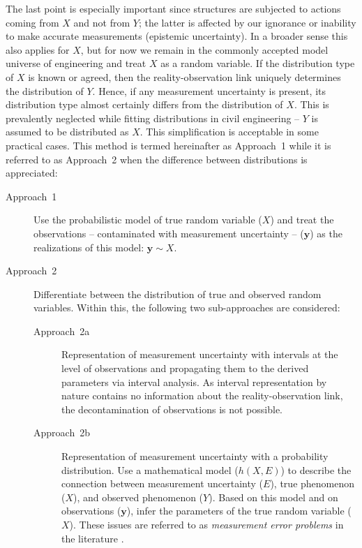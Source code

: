 The last point is especially important since structures are subjected to actions coming from $X$ and not from $Y$; the latter is affected by our ignorance or inability to make accurate measurements (epistemic uncertainty). In a broader sense this also applies for $X$, but for now we remain in the commonly accepted model universe of engineering and treat $X$ as a random variable. If the distribution type of $X$ is known or agreed, then the reality-observation link uniquely determines the distribution of $Y$. Hence, if any measurement uncertainty is present, its distribution type almost certainly differs from the distribution of $X$. This is prevalently neglected while fitting distributions in civil engineering -- $Y$ is assumed to be distributed as $X$. This simplification is acceptable in some practical cases. This method is termed hereinafter as Approach~1 while it is referred to as Approach~2 when the difference between distributions is appreciated:
\begin{description}
	\item[Approach~1] Use the probabilistic model of true random variable ($X$) and treat the observations -- contaminated with measurement uncertainty -- ($\mathbf{y}$) as the realizations of this model: $\mathbf{y} \sim X$.
	\item[Approach~2] Differentiate between the distribution of true and observed random variables. Within this, the following two sub-approaches are considered:
	\begin{description}
		\item[Approach~2a] Representation of measurement uncertainty with intervals at the level of observations and propagating them to the derived parameters via interval analysis. As interval representation by nature contains no information about the reality-observation link, the decontamination of observations is not possible.
		\item[Approach~2b] Representation of measurement uncertainty with a probability distribution. Use a mathematical model ($h(X, E)$) to describe the connection between measurement uncertainty ($E$), true phenomenon ($X$), and observed phenomenon ($Y$). Based on this model and on observations ($\mathbf{y}$), infer the parameters of the true random variable ($X$). These issues are referred to as \textit{measurement error problems} in the literature \citep{Kondlo2010}.
	\end{description}
\end{description}

